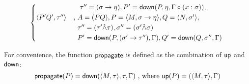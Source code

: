 \documentclass[main.tex]{subfiles}
\begin{document}
\begin{defn}
\[\begin{cases*}
                \phantom{} &\phantom{, } $\tau'' = (\sigma \tot \eta), P' = \mcf{down}(P, \eta, \Gamma \circ (x : \sigma)),$ \\
            \ttt{P' Q'}{\tau''}
                &, $A = (PQ), P = \ttt{M}{\sigma \tot \eta}, Q = \ttt{N}{\sigma'},$ \\
                \phantom{} &\phantom{, }$\tau'' = (\tau' \unify \tau), \sigma'' = (\sigma' \unify \sigma)$ \\
                \phantom{} &\phantom{, }$P' = \mcf{down}(P, (\sigma' \tot \tau''), \Gamma),
                Q' = \mcf{down}(Q, \sigma'', \Gamma)$ \\
        \end{cases*}
    \]

    For convenience, the function $\mathsf{propagate}$ is defined as the combination
    of $\mathsf{up}$ and $\mathsf{down}$:
    \[
        \mathsf{propagate}(P) = \mathsf{down}(\langle M, \tau \rangle, \tau, \Gamma)
        \text{ , where } \mathsf{up}(P) = (\langle M, \tau \rangle, \Gamma)
    \]
\end{defn}
\end{document}
